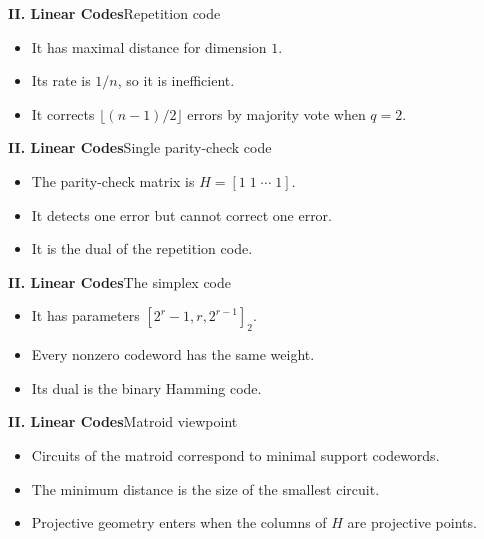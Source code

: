 \begin{frame}{\textbf{II. Linear Codes}}{Repetition code}
\small
{}
\begin{itemize}
  \item It has maximal distance for dimension $1$.
  \item Its rate is $1/n$, so it is inefficient.
  \item It corrects $\lfloor(n-1)/2\rfloor$ errors by majority vote when $q=2$.
\end{itemize}
\end{frame}

\begin{frame}{\textbf{II. Linear Codes}}{Single parity-check code}
\small
{}
\begin{itemize}
  \item The parity-check matrix is $H=[1\;1\;\cdots\;1]$.
  \item It detects one error but cannot correct one error.
  \item It is the dual of the repetition code.
\end{itemize}
\end{frame}

\begin{frame}{\textbf{II. Linear Codes}}{The simplex code}
\small
{}
\begin{itemize}
  \item It has parameters $[2^r-1,r,2^{r-1}]_2$.
  \item Every nonzero codeword has the same weight.
  \item Its dual is the binary Hamming code.
\end{itemize}
\end{frame}

\begin{frame}{\textbf{II. Linear Codes}}{Matroid viewpoint}
\small
{}
\begin{itemize}
  \item Circuits of the matroid correspond to minimal support codewords.
  \item The minimum distance is the size of the smallest circuit.
  \item Projective geometry enters when the columns of $H$ are projective points.
\end{itemize}
\end{frame}

